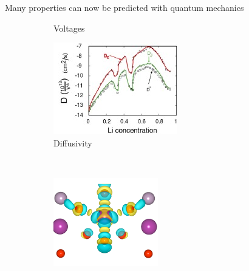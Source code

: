 \documentclass[aspectratio=169]{beamer}
\begin{document}
\begin{frame}{Many properties can now be predicted with quantum mechanics}
\begin{figure}
\begin{subfigure}{0.2\textwidth}
                \caption{Voltages\cite{chevrierHybridDensityFunctional2010}}
            \end{subfigure}
            \begin{subfigure}{0.2\textwidth}
                \includegraphics[width=\linewidth]{lectures/figures/1_Diffusivity.jpg}
                \caption{Diffusivity\cite{vandervenLithiumDiffusionLayered2000}}
            \end{subfigure}\\
            \begin{subfigure}{0.2\textwidth}
                \includegraphics[width=\linewidth]{lectures/figures/1_polarons.png}

\end{subfigure}
\end{figure}
\end{frame}
\end{document}

